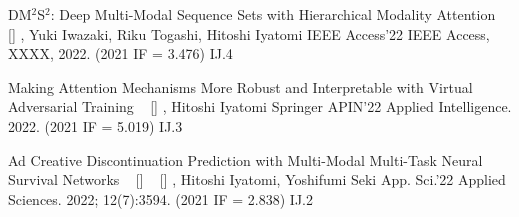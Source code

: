 
\begin{publications}
    \publication
    {DM$^2$S$^2$: Deep Multi-Modal Sequence Sets with Hierarchical Modality Attention}
    {
    ~ [\href{https://arxiv.org/abs/2209.03126}{\small{\arxivSymbol}}]
    }
    {\underline{}, Yuki Iwazaki, Riku Togashi, Hitoshi Iyatomi}
    {IEEE Access'22} {IEEE Access, XXXX, 2022. (2021 IF = 3.476)} {IJ.4}

    \publication
    {Making Attention Mechanisms More Robust and Interpretable with Virtual Adversarial Training}
    {
    ~ [\href{https://arxiv.org/abs/2104.08763}{\small{\arxivSymbol}}]
    }
    {\underline{}, Hitoshi Iyatomi}
    {Springer APIN'22} {Applied Intelligence. 2022. (2021 IF = 5.019)} {IJ.3}

    \publication
    {Ad Creative Discontinuation Prediction with Multi-Modal Multi-Task Neural Survival Networks}
    {
    ~ [\href{https://doi.org/10.3390/app12073594}{\small{\doiSymbol}}]
    ~ [\href{https://arxiv.org/abs/2204.11588}{\small{\arxivSymbol}}]
    }
    {\underline{}, Hitoshi Iyatomi, Yoshifumi Seki}
    {App. Sci.'22} {Applied Sciences. 2022; 12(7):3594. (2021 IF = 2.838)} {IJ.2}
\end{publications}

